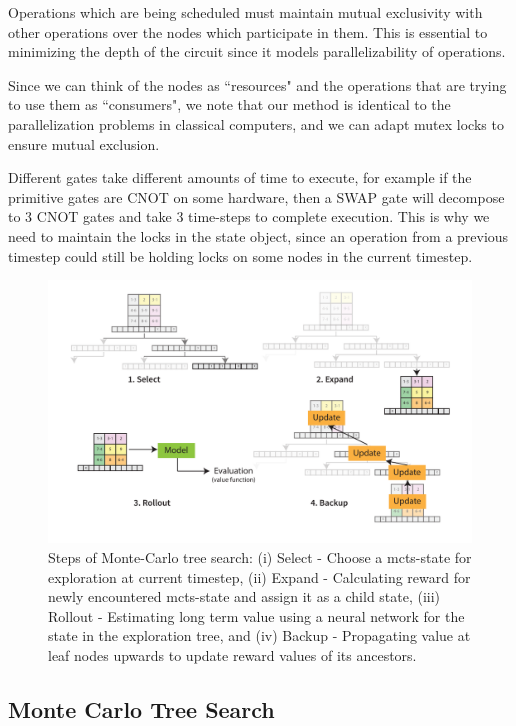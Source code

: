 \documentclass[%
 reprint,
 longbibliography,
 amsmath,amssymb,
 aps,
]{revtex4-2}
\begin{document}
Operations which are being scheduled must maintain mutual exclusivity with other operations over the nodes which participate in them. This is essential to minimizing the depth of the circuit since it models parallelizability of operations.

Since we can think of the nodes as ``resources" and the operations that are trying to use them as ``consumers", we note that our method is identical to the parallelization problems in classical computers, and we can adapt mutex locks \citet{mutex_dijkstra} to ensure mutual exclusion.

Different gates take different amounts of time to execute, for example if the primitive gates are CNOT on some hardware, then a SWAP gate will decompose to 3 CNOT gates and take 3 time-steps to complete execution. This is why we need to maintain the locks in the state object, since an operation from a previous timestep could still be holding locks on some nodes in the current timestep.

\begin{figure}[t]
    \includegraphics[width=\linewidth]{images/Search.pdf}
    \caption{\label{fig:mcts-explainer}
        Steps of Monte-Carlo tree search: (i) Select - Choose a mcts-state for exploration at current timestep, (ii) Expand - Calculating reward for newly encountered mcts-state and assign it as a child state, (iii) Rollout - Estimating long term value using a neural network for the state in the exploration tree, and (iv) Backup - Propagating value at leaf nodes upwards to update reward values of its ancestors.}
\end{figure}

\subsection{\label{sec:method-mcts}Monte Carlo Tree Search}
\end{document}
